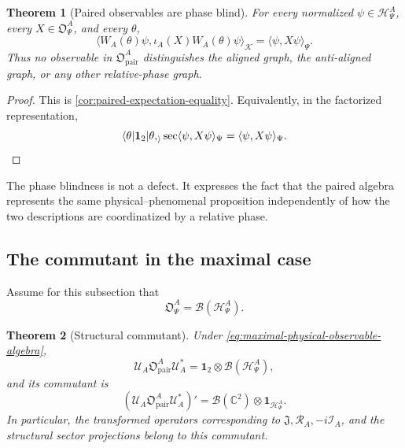 \documentclass[11pt,reqno]{scrartcl}
\newcommand{\CC}{\mathbb C}
\newcommand{\scrK}{\mathscr K}
\newcommand{\fundJ}{\mathfrak J}
\newcommand{\idop}{\mathbf 1}
\newcommand{\RA}{\mathcal R_{A}}
\newcommand{\IA}{\mathcal I_{A}}
\newcommand{\inner}[2]{\langle #1,#2\rangle}
\newcommand{\actHP}{\mathscr H_{\Psi}^{A}}
\newcommand{\WAtheta}{W_{A}(\theta)}
\newcommand{\iotaA}{\iota_{A}}
\newcommand{\obsP}{\mathfrak O_{\Psi}^{A}}
\newcommand{\obsPair}{\mathfrak O_{\mathrm{pair}}^{A}}
\newcommand{\UA}{\mathcal U_{A}}
\theoremstyle{plain}
\newtheorem{theorem}{Theorem}[section]
\theoremstyle{definition}
\theoremstyle{remark}
\begin{document}
\begin{theorem}[Paired observables are phase blind]
\label{thm:paired-observables-phase-blind}
For every normalized \(\psi\in\actHP\), every \(X\in\obsP\), and every
\(\theta\),
\begin{equation}
  \inner{\WAtheta\psi}{\iotaA(X)\WAtheta\psi}_{\scrK}
  =\inner{\psi}{X\psi}_{\Psi}.
  \label{eq:phase-blind-expectation}
\end{equation}
Thus no observable in \(\obsPair\) distinguishes the aligned graph, the
anti-aligned graph, or any other relative-phase graph.
\end{theorem}

\begin{proof}
This is \cref{cor:paired-expectation-equality}.  Equivalently, in the
factorized representation,
\begin{equation}
  \inner{\theta|\idop_2|\theta}_{\mathrm{sec}}
  \inner{\psi}{X\psi}_{\Psi}
  =\inner{\psi}{X\psi}_{\Psi}.
\end{equation}
\end{proof}

The phase blindness is not a defect.  It expresses the fact that the paired
algebra represents the same physical--phenomenal proposition independently
of how the two descriptions are coordinatized by a relative phase.

\subsection{The commutant in the maximal case}

Assume for this subsection that
\begin{equation}
  \obsP=\mathcal B(\actHP).
  \label{eq:maximal-physical-observable-algebra}
\end{equation}

\begin{theorem}[Structural commutant]
\label{thm:structural-commutant}
Under \cref{eq:maximal-physical-observable-algebra},
\begin{equation}
  \UA\obsPair\UA^*
  =\idop_2\otimes\mathcal B(\actHP),
  \label{eq:paired-full-factor}
\end{equation}
and its commutant is
\begin{equation}
  \boxed{
  (\UA\obsPair\UA^*)'
  =\mathcal B(\CC^2)\otimes\idop_{\actHP}.}
  \label{eq:paired-full-commutant}
\end{equation}
In particular, the transformed operators corresponding to
\(\fundJ,\RA,-i\IA\), and the structural sector projections belong to this
commutant.
\end{theorem}
\end{document}
